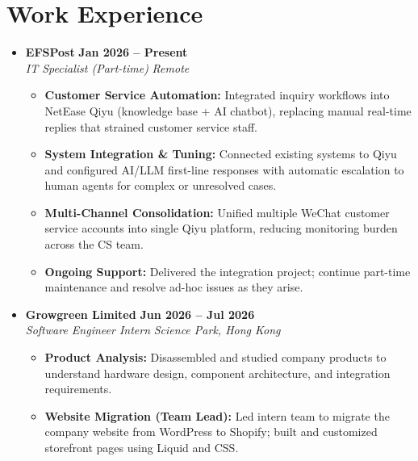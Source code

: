 \documentclass[a4paper,10pt]{article}
\begin{document}
\section{Work Experience}
\begin{itemize}[leftmargin=*, label={}, itemsep=1pt]
    \item \textbf{EFSPost} \hfill \textbf{Jan 2026 -- Present} \\
    \textit{IT Specialist (Part-time)} \hfill \textit{Remote}
    \begin{itemize}[leftmargin=1.2em, label={--}, itemsep=0pt, topsep=1pt]
        \item \textbf{Customer Service Automation:} Integrated inquiry workflows into NetEase Qiyu (knowledge base + AI chatbot), replacing manual real-time replies that strained customer service staff.
        \item \textbf{System Integration \& Tuning:} Connected existing systems to Qiyu and configured AI/LLM first-line responses with automatic escalation to human agents for complex or unresolved cases.
        \item \textbf{Multi-Channel Consolidation:} Unified multiple WeChat customer service accounts into single Qiyu platform, reducing monitoring burden across the CS team.
        \item \textbf{Ongoing Support:} Delivered the integration project; continue part-time maintenance and resolve ad-hoc issues as they arise.
    \end{itemize}

    \item \textbf{Growgreen Limited} \hfill \textbf{Jun 2026 -- Jul 2026} \\
    \textit{Software Engineer Intern} \hfill \textit{Science Park, Hong Kong}
    \begin{itemize}[leftmargin=1.2em, label={--}, itemsep=0pt, topsep=1pt]
        \item \textbf{Product Analysis:} Disassembled and studied company products to understand hardware design, component architecture, and integration requirements.
        \item \textbf{Website Migration (Team Lead):} Led intern team to migrate the company website from WordPress to Shopify; built and customized storefront pages using Liquid and CSS.
    \end{itemize}


\end{itemize}
\end{document}
